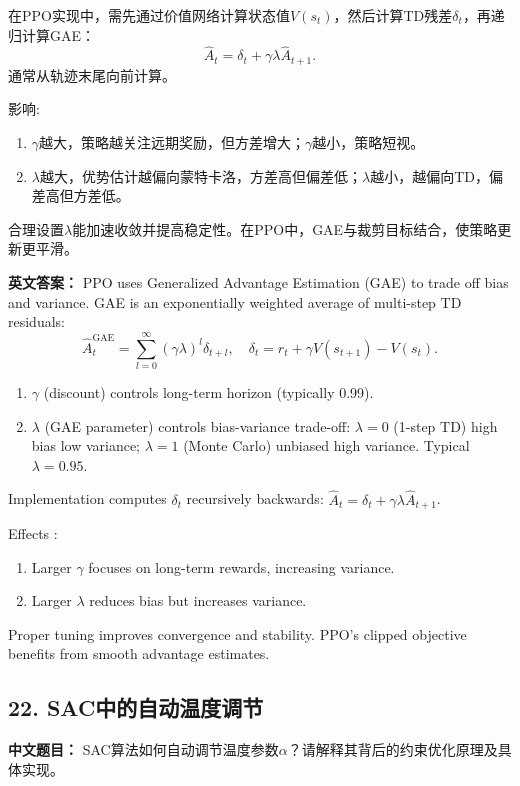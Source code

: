 \documentclass[10pt,a4paper]{ctexart}
\begin{document}
在PPO实现中，需先通过价值网络计算状态值\(V(s_t)\)，然后计算TD残差\(\delta_t\)，再递归计算GAE：
\[
\hat{A}_t = \delta_t + \gamma\lambda \hat{A}_{t+1}.
\]  
通常从轨迹末尾向前计算。

 影响:
\begin{enumerate}
    \item \(\gamma\)越大，策略越关注远期奖励，但方差增大；\(\gamma\)越小，策略短视。
    \item \(\lambda\)越大，优势估计越偏向蒙特卡洛，方差高但偏差低；\(\lambda\)越小，越偏向TD，偏差高但方差低。
\end{enumerate}

合理设置\(\lambda\)能加速收敛并提高稳定性。在PPO中，GAE与裁剪目标结合，使策略更新更平滑。

\textbf{英文答案：}  
PPO uses Generalized Advantage Estimation (GAE) to trade off bias and variance. GAE is an exponentially weighted average of multi-step TD residuals:
\[
\hat{A}_t^{\text{GAE}} = \sum_{l=0}^{\infty} (\gamma\lambda)^l \delta_{t+l}, \quad \delta_t = r_t + \gamma V(s_{t+1}) - V(s_t).
\]  
\begin{enumerate}
    \item \(\gamma\) (discount) controls long-term horizon (typically 0.99).
    \item \(\lambda\) (GAE parameter) controls bias-variance trade-off: \(\lambda=0\) (1-step TD) high bias low variance; \(\lambda=1\) (Monte Carlo) unbiased high variance. Typical \(\lambda=0.95\).
\end{enumerate}

Implementation computes \(\delta_t\) recursively backwards: \(\hat{A}_t = \delta_t + \gamma\lambda \hat{A}_{t+1}\).

 Effects :
\begin{enumerate}
    \item Larger \(\gamma\) focuses on long-term rewards, increasing variance.
    \item Larger \(\lambda\) reduces bias but increases variance.
\end{enumerate}

Proper tuning improves convergence and stability. PPO's clipped objective benefits from smooth advantage estimates.

\subsection*{22. SAC中的自动温度调节}
\textbf{中文题目：} SAC算法如何自动调节温度参数\(\alpha\)？请解释其背后的约束优化原理及具体实现。
\end{document}
